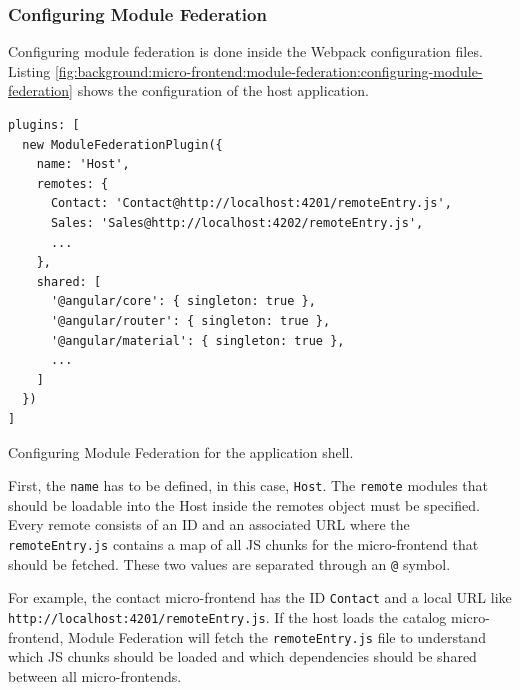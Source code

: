 \subsubsection{Configuring Module Federation}\label{subsubsection:background:micro-frontend:module-federation:configuring-module-federation}

Configuring module federation is done inside the Webpack configuration files. Listing \ref{fig:background:micro-frontend:module-federation:configuring-module-federation} shows the configuration of the host application.

\ifshowListings
\begin{listing}[H]
    \begin{verbatim}
plugins: [
  new ModuleFederationPlugin({
    name: 'Host',
    remotes: {
      Contact: 'Contact@http://localhost:4201/remoteEntry.js',
      Sales: 'Sales@http://localhost:4202/remoteEntry.js',
      ...
    },
    shared: [
      '@angular/core': { singleton: true },
      '@angular/router': { singleton: true },
      '@angular/material': { singleton: true },
      ...
    ]
  })
]
    \end{verbatim}
    \caption{Configuring Module Federation for the application shell.}\label{fig:background:micro-frontend:module-federation:configuring-module-federation}
\end{listing}
\fi

\noindent First, the \texttt{name} has to be defined, in this case, \texttt{Host}. The \texttt{remote} modules that should be loadable into the Host inside the remotes object must be specified. Every remote consists of an ID and an associated \ac{URL} where the \texttt{remoteEntry.js} contains a map of all \ac{JS} chunks for the micro-frontend that should be fetched. These two values are separated through an \texttt{@} symbol. \cite[124]{book:2021:mezzalira:applied-methods:building-micro-frontends}

\bigskip

\noindent For example, the contact micro-frontend has the ID \texttt{Contact} and a local \ac{URL} like \texttt{http:\slash \slash localhost:4201\slash remoteEntry.js}. If the host loads the catalog micro-frontend, Module Federation will fetch the \texttt{remoteEntry.js} file to understand which \ac{JS} chunks should be loaded and which dependencies should be shared between all micro-frontends. \cite[125]{book:2021:mezzalira:applied-methods:building-micro-frontends}

\bigskip

